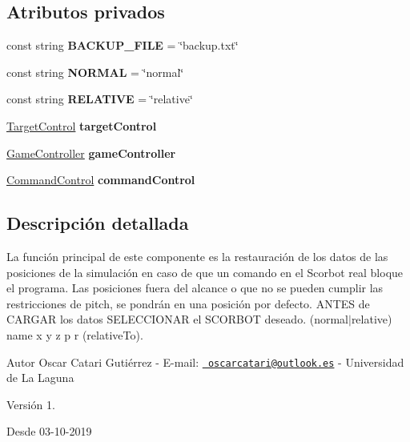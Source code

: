 \subsection*{Atributos privados}
\begin{DoxyCompactItemize}
\item 
\mbox{\label{class_back_up_file_control_a9b55199bd8c6e402fb83404ae37939a9}} 
const string {\bfseries B\+A\+C\+K\+U\+P\+\_\+\+F\+I\+LE} = \char`\"{}backup.\+txt\char`\"{}
\item 
\mbox{\label{class_back_up_file_control_ad1005e64c44edc9a9ddb76bf4fa2cf5c}} 
const string {\bfseries N\+O\+R\+M\+AL} = \char`\"{}normal\char`\"{}
\item 
\mbox{\label{class_back_up_file_control_a4a6e6a1e0a7b4fc417d48068feafe302}} 
const string {\bfseries R\+E\+L\+A\+T\+I\+VE} = \char`\"{}relative\char`\"{}
\item 
\mbox{\label{class_back_up_file_control_a1ce59ee4078f4d3546eb67694ce1c16e}} 
\mbox{\hyperlink{class_target_control}{Target\+Control}} {\bfseries target\+Control}
\item 
\mbox{\label{class_back_up_file_control_ac962072454aad89d3a4aad93c7791ba9}} 
\mbox{\hyperlink{class_game_controller}{Game\+Controller}} {\bfseries game\+Controller}
\item 
\mbox{\label{class_back_up_file_control_a18e4e0e682dc3d224402abb18b4e7a68}} 
\mbox{\hyperlink{class_command_control}{Command\+Control}} {\bfseries command\+Control}
\end{DoxyCompactItemize}


\subsection{Descripción detallada}
La función principal de este componente es la restauración de los datos de las posiciones de la simulación en caso de que un comando en el Scorbot real bloque el programa. Las posiciones fuera del alcance o que no se pueden cumplir las restricciones de pitch, se pondrán en una posición por defecto. A\+N\+T\+ES de C\+A\+R\+G\+AR los datos S\+E\+L\+E\+C\+C\+I\+O\+N\+AR el S\+C\+O\+R\+B\+OT deseado. (normal$\vert$relative) name x y z p r (relative\+To). \begin{DoxyAuthor}{Autor}
Oscar Catari Gutiérrez -\/ E-\/mail\+: \href{mailto:oscarcatari@outlook.es}{\texttt{ oscarcatari@outlook.\+es}} -\/ Universidad de La Laguna 
\end{DoxyAuthor}
\begin{DoxyVersion}{Versión}
1. 
\end{DoxyVersion}
\begin{DoxySince}{Desde}
03-\/10-\/2019 
\end{DoxySince}


